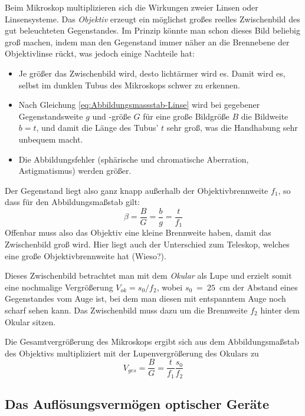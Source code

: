 Beim Mikroskop multiplizieren sich die Wirkungen zweier Linsen oder Linsensysteme. Das \textit{Objektiv} erzeugt ein möglichst großes reelles Zwischenbild des gut beleuchteten Gegenstandes. Im Prinzip könnte man schon dieses Bild beliebig groß machen, indem man den Gegenstand immer näher an die Brennebene der Objektivlinse rückt, was jedoch einige Nachteile hat:
\begin{itemize}
	\item Je größer das Zwischenbild wird, desto lichtärmer wird es. Damit wird es, selbst im dunklen Tubus des Mikroskops schwer zu erkennen.
	\item Nach Gleichung \ref{eq:Abbildungsmassstab-Linse} wird bei gegebener Gegenstandsweite $g$ und -größe $G$ für eine große Bildgröße $B$ die Bildweite $b = t$, und damit die Länge des Tubus' $t$ sehr groß, was die Handhabung sehr unbequem macht.
	\item Die Abbildungsfehler (sphärische und chromatische Aberration, Astigmatismus) werden größer.
\end{itemize}
Der Gegenstand liegt also ganz knapp außerhalb der Objektivbrennweite $f_1$, so dass für den Abbildungsmaßstab gilt:
\begin{equation}
	\beta = \frac{B}{G} = \frac{b}{g} = \frac{t}{f_1}
\end{equation}
Offenbar muss also das Objektiv eine kleine Brennweite haben, damit das Zwischenbild groß wird. Hier liegt auch der Unterschied zum Teleskop, welches eine große Objektivbrennweite hat (Wieso?).

Dieses Zwischenbild betrachtet man mit dem \textit{Okular} als Lupe und erzielt somit eine nochmalige Vergrößerung $V_{ok}=s_0/f_2$, wobei $s_0~=~25$~cm der Abstand eines Gegenstandes vom Auge ist, bei dem man diesen mit entspanntem Auge noch scharf sehen kann. Das Zwischenbild muss dazu um die Brennweite $f_2$ hinter dem Okular sitzen.

Die Gesamtvergrößerung des Mikroskops ergibt sich aus dem Abbildungsmaßstab des Objektivs multipliziert mit der Lupenvergrößerung des Okulars zu
\begin{equation}
	V_{ges} = \frac{B}{G} = \frac{t}{f_1} \frac{s_0}{f_2}
\label{eq:Vergoesserung_Mikroskop}
\end{equation}

\subsection{Das Auflösungsvermögen optischer Geräte}

